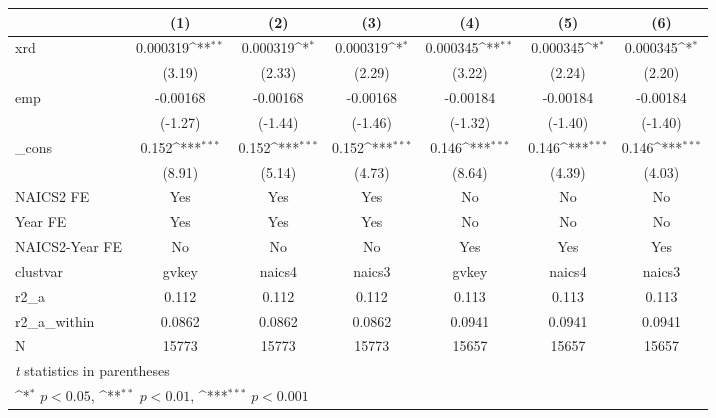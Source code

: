 {
\def\sym#1{\ifmmode^{#1}\else\(^{#1}\)\fi}
\begin{tabular}{l*{6}{c}}
\hline\hline
            &\multicolumn{1}{c}{(1)}         &\multicolumn{1}{c}{(2)}         &\multicolumn{1}{c}{(3)}         &\multicolumn{1}{c}{(4)}         &\multicolumn{1}{c}{(5)}         &\multicolumn{1}{c}{(6)}         \\
\hline
xrd         &    0.000319\sym{**} &    0.000319\sym{*}  &    0.000319\sym{*}  &    0.000345\sym{**} &    0.000345\sym{*}  &    0.000345\sym{*}  \\
            &      (3.19)         &      (2.33)         &      (2.29)         &      (3.22)         &      (2.24)         &      (2.20)         \\
[1em]
emp         &    -0.00168         &    -0.00168         &    -0.00168         &    -0.00184         &    -0.00184         &    -0.00184         \\
            &     (-1.27)         &     (-1.44)         &     (-1.46)         &     (-1.32)         &     (-1.40)         &     (-1.40)         \\
[1em]
\_cons      &       0.152\sym{***}&       0.152\sym{***}&       0.152\sym{***}&       0.146\sym{***}&       0.146\sym{***}&       0.146\sym{***}\\
            &      (8.91)         &      (5.14)         &      (4.73)         &      (8.64)         &      (4.39)         &      (4.03)         \\
[1em]
NAICS2 FE   &         Yes         &         Yes         &         Yes         &          No         &          No         &          No         \\
[1em]
Year FE     &         Yes         &         Yes         &         Yes         &          No         &          No         &          No         \\
[1em]
NAICS2-Year FE&          No         &          No         &          No         &         Yes         &         Yes         &         Yes         \\
\hline
clustvar    &       gvkey         &      naics4         &      naics3         &       gvkey         &      naics4         &      naics3         \\
r2\_a        &       0.112         &       0.112         &       0.112         &       0.113         &       0.113         &       0.113         \\
r2\_a\_within &      0.0862         &      0.0862         &      0.0862         &      0.0941         &      0.0941         &      0.0941         \\
N           &       15773         &       15773         &       15773         &       15657         &       15657         &       15657         \\
\hline\hline
\multicolumn{7}{l}{\footnotesize \textit{t} statistics in parentheses}\\
\multicolumn{7}{l}{\footnotesize \sym{*} \(p<0.05\), \sym{**} \(p<0.01\), \sym{***} \(p<0.001\)}\\
\end{tabular}
}

